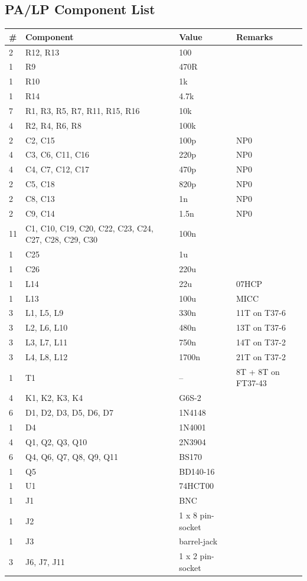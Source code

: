 \documentclass[10pt, a4paper,twoside]{scrartcl}
\begin{document}
\subsection{PA/LP Component List}  \label{sec:pacomp}
\begin{longtable}{|l|p{6cm}|l|l|} \hline 
\# & Component & Value & Remarks \\ \hline 
2 & R12, R13 & 100 & \\
1 & R9 & 470R & \\
1 & R10 & 1k & \\
1 & R14 & 4.7k & \\
7 & R1, R3, R5, R7, R11, R15, R16 & 10k & \\
4 & R2, R4, R6, R8 & 100k & \\
2 & C2, C15 & 100p & NP0 \\
4 & C3, C6, C11, C16 & 220p & NP0 \\
4 & C4, C7, C12, C17 & 470p & NP0 \\
2 & C5, C18 & 820p & NP0 \\
2 & C8, C13 & 1n & NP0 \\
2 & C9, C14 & 1.5n & NP0 \\
11 & C1, C10, C19, C20, C22, C23, C24, C27, C28, C29, C30 & 100n & \\
1 & C25 & 1u & \\
1 & C26 & 220u & \\
1 & L14 & 22u & 07HCP \\
1 & L13 & 100u & MICC \\
3 & L1, L5, L9 & 330n & 11T on T37-6 \\
3 & L2, L6, L10 & 480n & 13T on T37-6 \\
3 & L3, L7, L11 & 750n & 14T on T37-2 \\
3 & L4, L8, L12 & 1700n & 21T on T37-2 \\
1 & T1 & -- & 8T + 8T on FT37-43 \\
4 & K1, K2, K3, K4 & G6S-2 & \\
6 & D1, D2, D3, D5, D6, D7 & 1N4148 & \\
1 & D4 & 1N4001 & \\	
4 & Q1, Q2, Q3, Q10 & 2N3904 & \\
6 & Q4, Q6, Q7, Q8, Q9, Q11 & BS170 & \\
1 & Q5 & BD140-16 & \\
1 & U1 & 74HCT00 & \\
1 & J1 & BNC & \\
1 & J2 & 1 x 8 pin-socket & \\
1 & J3 & barrel-jack & \\
3 & J6, J7, J11 & 1 x 2 pin-socket & \\ \hline
\end{longtable}
\end{document}
